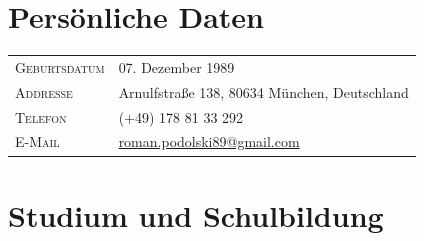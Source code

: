 \documentclass[a4paper,10pt]{article} %
\begin{document}
 
\pagestyle{empty} %
 
 
\par{\bigskip\par} %
 
\section{Persönliche Daten}
 
\begin{tabular}{l@{: }l}
\textsc{Geburtsdatum} & 07. Dezember 1989 \\
\textsc{Addresse}     & Arnulfstraße 138, 80634 München, Deutschland \\
\textsc{Telefon}      & (+49) 178 81 33 292\\
\textsc{E-Mail}       & \href{mailto:roman.podolski89@gmail.com}{roman.podolski89@gmail.com}
\end{tabular}
 
 
\section{Studium und Schulbildung}
 
\end{document}
